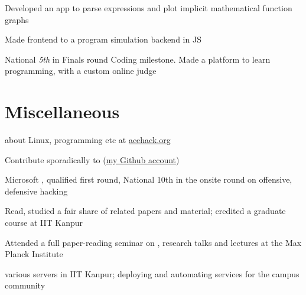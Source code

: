 \documentclass[a4paper]{deedy-resume} %
\begin{document}
\begin{minipage}[t]{0.66\textwidth}
  \sectionspace

  \runsubsection{}
  \begin{tightitemize}
  \item Developed an app to parse expressions and
    plot implicit mathematical function graphs
  \item Made frontend to a program simulation backend in JS
  \item National \textit{5th} in Finals round Coding milestone.
    Made a platform to learn programming, with a custom online judge
  \end{tightitemize}

  \section{Miscellaneous}
  \vspace{\topsep}
  \begin{tightitemize}
  \item {} about Linux, programming etc at
    \href{http://acehack.org}{acehack.org}
  \item Contribute sporadically to 
    (\href{https://github.com/sakshamsharma}{my Github account})
  \item Microsoft , qualified first round,
    National 10th in the onsite round on offensive, defensive hacking
  \item Read, studied a fair share of  related
    papers and material; credited a graduate course at IIT Kanpur
  \item	Attended a full paper-reading seminar on , research talks and lectures at the Max Planck Institute
  \item {} various servers in IIT Kanpur; deploying and
    automating services for the campus community
  \end{tightitemize}

\end{minipage}



\end{document}
